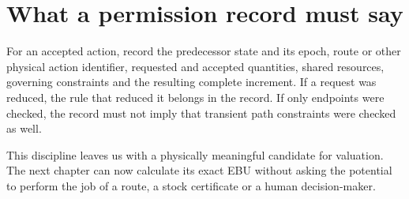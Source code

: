 \section{What a permission record must say}
For an accepted action, record the predecessor state and its epoch, route or
other physical action identifier, requested and accepted quantities, shared
resources, governing constraints and the resulting complete increment. If a
request was reduced, the rule that reduced it belongs in the record. If
only endpoints were checked, the record must not imply that transient path
constraints were checked as well.

This discipline leaves us with a physically meaningful candidate for
valuation. The next chapter can now calculate its exact EBU without asking
the potential to perform the job of a route, a stock certificate or a human
decision-maker.
